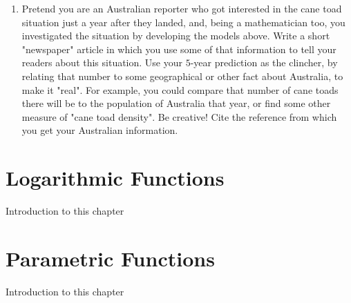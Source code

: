\documentclass[10pt,]{book}
\theoremstyle{plain}
\theoremstyle{definition}
\theoremstyle{definition}
\theoremstyle{definition}
\numberwithin{equation}{section}
\begin{document}
\begin{exerciselist}
\begin{enumerate}[label=(\alph*)]
\item\hypertarget{li-170}{}Pretend you are an Australian reporter who got interested in the cane toad situation just a year after they landed, and, being a mathematician too, you investigated the situation by developing the models above.  Write a short "newspaper" article in which you use some of that information to tell your readers about this situation.  Use your \(5\)-year prediction as the clincher, by relating that number to some geographical or other fact about Australia, to make it "real".  For example, you could compare that number of cane toads there will be to the population of Australia that year, or find some other measure of "cane toad density".  Be creative!  Cite the reference from which you get your Australian information.%
\end{enumerate}
\par\smallskip
\end{exerciselist}
\typeout{************************************************}
\typeout{************************************************}
\chapter[{Logarithmic Functions}]{Logarithmic Functions}\label{chapter05}
\hypertarget{p-272}{}%
Introduction to this chapter%
\typeout{************************************************}
\typeout{************************************************}
\section[{}]{}\label{chapter05-section01}
\typeout{************************************************}
\typeout{************************************************}
\chapter[{Parametric Functions}]{Parametric Functions}\label{chapter06}
\hypertarget{p-273}{}%
Introduction to this chapter%
\typeout{************************************************}
\typeout{************************************************}
\section[{}]{}\label{chapter06-section01}
\typeout{************************************************}
\typeout{************************************************}
\end{document}
